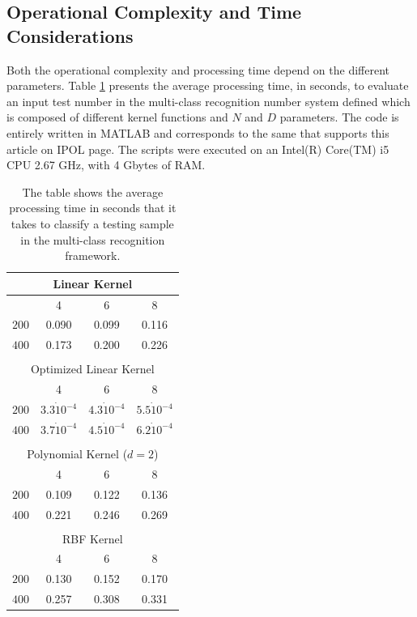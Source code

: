 \documentclass{ipol}
\begin{document}
\subsection{Operational Complexity and Time Considerations}

Both the operational complexity and processing time depend on the different parameters.
Table \ref{tab:kernelsTime} presents the average processing time, in seconds, to evaluate an input test number in the multi-class recognition number system defined which is composed of different kernel functions and $N$ and $D$ parameters.
The code is entirely written in MATLAB and corresponds to the same that supports this article on IPOL page.
The scripts were executed on an Intel(R) Core(TM) i5 CPU 2.67 GHz, with 4 Gbytes of RAM.

\begin{table}[!htbp]
\small
	\begin{center}
 		\begin{tabular}{|c|c|c|c|}
			      \multicolumn{4}{c}{Linear Kernel} \\
						\hline
		\backslashbox{$N$}{$D$} & 4 & 6 & 8 \\
\hline
$200$ & 0.090 & 0.099 & 0.116 \\
 $400$ & 0.173 & 0.200 & 0.226 \\
\hline
\multicolumn{4}{c}{}\\
			      \multicolumn{4}{c}{Optimized Linear Kernel} \\
						\hline
		\backslashbox{$N$}{$D$} & 4 & 6 & 8 \\
\hline
$200$ & $3.3 \dot 10^{-4}$ & $4.3 \dot 10^{-4}$ & $5.5 \dot 10^{-4}$ \\
 $400$ & $3.7 \dot 10^{-4}$ & $4.5 \dot 10^{-4}$ & $6.2 \dot 10^{-4}$ \\
\hline
\multicolumn{4}{c}{}\\
			      \multicolumn{4}{c}{Polynomial Kernel ($d=2$)} \\
						\hline
		\backslashbox{$N$}{$D$} & 4 & 6 & 8 \\
		\hline
$200$ & 0.109 & 0.122 & 0.136 \\
 $400$ & 0.221 & 0.246 & 0.269 \\
\hline
\multicolumn{4}{c}{}\\
			      \multicolumn{4}{c}{RBF Kernel} \\
						\hline
		\backslashbox{$N$}{$D$} & 4 & 6 & 8 \\
		\hline
$200$ & 0.130 & 0.152 & 0.170 \\
 $400$ & 0.257 & 0.308 & 0.331 \\
\hline
\end{tabular}
\end{center}
\caption{The table shows the average processing time in seconds that it takes to classify a testing sample in the multi-class recognition framework.}
\label{tab:kernelsTime}
\end{table}
\end{document}
